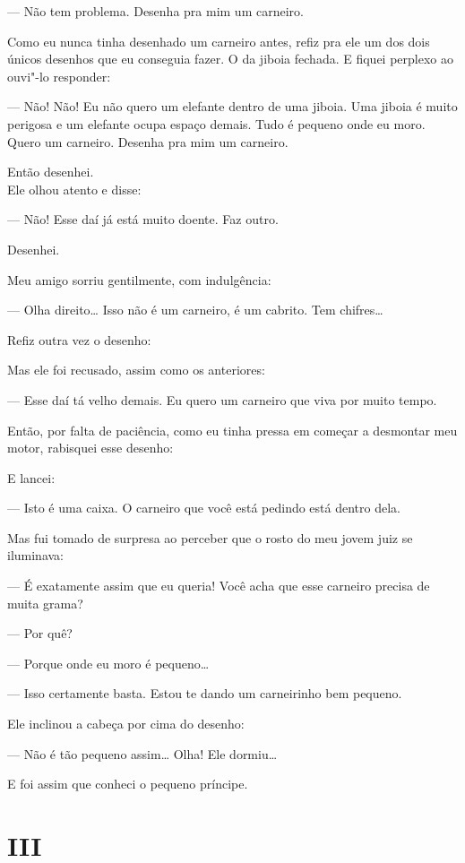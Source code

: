\begin{Parallel}[p]{}{}
{--- Não tem problema. Desenha pra mim um carneiro.

Como eu nunca tinha desenhado um carneiro antes, refiz pra ele um dos
dois únicos desenhos que eu conseguia fazer. O da jiboia fechada. E
fiquei perplexo ao ouvi"-lo responder:

--- Não! Não! Eu não quero um elefante dentro de uma jiboia. Uma jiboia é
muito perigosa e um elefante ocupa espaço demais. Tudo é pequeno onde eu
moro. Quero um carneiro. Desenha pra mim um carneiro.

Então desenhei.\\

Ele olhou atento e disse:

--- Não! Esse daí já está muito doente. Faz outro.

Desenhei.

Meu amigo sorriu gentilmente, com indulgência:

--- Olha direito\ldots{} Isso não é um carneiro, é um cabrito. Tem chifres\ldots{}

Refiz outra vez o desenho:

Mas ele foi recusado, assim como os anteriores:

--- Esse daí tá velho demais. Eu quero um carneiro que viva por muito
tempo.

Então, por falta de paciência, como eu tinha pressa em começar a
desmontar meu motor, rabisquei esse desenho:

E lancei:

--- Isto é uma caixa. O carneiro que você está pedindo está dentro dela.

Mas fui tomado de surpresa ao perceber que o rosto do meu jovem juiz se
iluminava:

--- É exatamente assim que eu queria! Você acha que esse carneiro precisa
de muita grama?

--- Por quê?

--- Porque onde eu moro é pequeno\ldots{}

--- Isso certamente basta. Estou te dando um carneirinho bem pequeno.

Ele inclinou a cabeça por cima do desenho:

--- Não é tão pequeno assim\ldots{} Olha! Ele dormiu\ldots{}

E foi assim que conheci o pequeno príncipe.

\section{III}

}
\end{Parallel}
